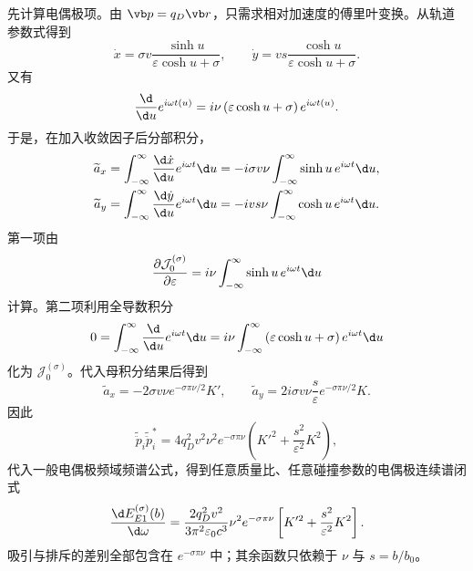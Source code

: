 先计算电偶极项。由 $\vb p=q_D\vb r$，只需求相对加速度的傅里叶变换。从轨道参数式得到
\begin{equation*}
	\dot x=\sigma v\frac{\sinh u}{\varepsilon\cosh u+\sigma},
	\qquad
	\dot y=vs\frac{\cosh u}{\varepsilon\cosh u+\sigma}.
\end{equation*}
又有
\begin{equation*}
	\frac{\d}{\d u}e^{i\omega t(u)}
	=i\nu\left(\varepsilon\cosh u+\sigma\right)e^{i\omega t(u)}.
\end{equation*}
于是，在加入收敛因子后分部积分，
\begin{equation*}
	\begin{aligned}
	\widetilde a_x
	&=\int_{-\infty}^{\infty}\frac{\d\dot x}{\d u}e^{i\omega t}\d u
	=-i\sigma v\nu\int_{-\infty}^{\infty}\sinh u\,e^{i\omega t}\d u,\\
	\widetilde a_y
	&=\int_{-\infty}^{\infty}\frac{\d\dot y}{\d u}e^{i\omega t}\d u
	=-ivs\nu\int_{-\infty}^{\infty}\cosh u\,e^{i\omega t}\d u.
	\end{aligned}
\end{equation*}
第一项由
\begin{equation*}
	\frac{\partial\mathcal J_0^{(\sigma)}}{\partial\varepsilon}
	=i\nu\int_{-\infty}^{\infty}\sinh u\,e^{i\omega t}\d u
\end{equation*}
计算。第二项利用全导数积分
\begin{equation*}
	0=\int_{-\infty}^{\infty}\frac{\d}{\d u}e^{i\omega t}\d u
	=i\nu\int_{-\infty}^{\infty}
	\left(\varepsilon\cosh u+\sigma\right)e^{i\omega t}\d u
\end{equation*}
化为 $\mathcal J_0^{(\sigma)}$。代入母积分结果后得到
\begin{equation*}
	\widetilde a_x=-2\sigma v\nu e^{-\sigma\pi\nu/2}K',
	\qquad
	\widetilde a_y=2i\sigma v\nu\frac{s}{\varepsilon}e^{-\sigma\pi\nu/2}K.
\end{equation*}
因此
\begin{equation*}
	\widetilde{\ddot p}_i\widetilde{\ddot p}_i^*
	=4q_D^2v^2\nu^2e^{-\sigma\pi\nu}
	\left(K'^2+\frac{s^2}{\varepsilon^2}K^2\right),
\end{equation*}
代入一般电偶极频域频谱公式，得到任意质量比、任意碰撞参数的电偶极连续谱闭式
\begin{equation*}
	\frac{\d E_{E1}^{(\sigma)}(b)}{\d\omega}
	=\frac{2q_D^2v^2}{3\pi^2\varepsilon_0c^3}
	\nu^2e^{-\sigma\pi\nu}
	\left[
	K'^2+\frac{s^2}{\varepsilon^2}K^2
	\right].
\end{equation*}
吸引与排斥的差别全部包含在 $e^{-\sigma\pi\nu}$ 中；其余函数只依赖于 $\nu$ 与 $s=b/b_0$。

